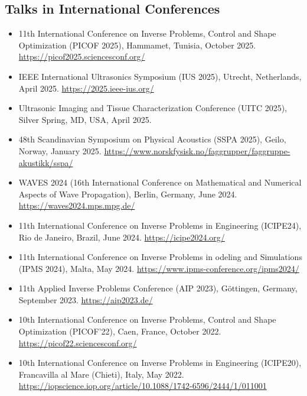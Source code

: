 \documentclass[10pt]{article}
\begin{document}
\subsection{Talks in International Conferences}
\begin{itemize}
\item 11th International Conference on Inverse Problems, Control and Shape Optimization (PICOF 2025), Hammamet, Tunisia, October 2025. \url{https://picof2025.sciencesconf.org/}
\item IEEE International Ultrasonics Symposium (IUS 2025), Utrecht, Netherlands, April 2025. \url{https://2025.ieee-ius.org/}
\item Ultrasonic Imaging and Tissue Characterization Conference (UITC 2025), Silver Spring, MD, USA, April 2025.
\item 48th Scandinavian Symposium on Physical Acoustics (SSPA 2025), Geilo, Norway, January 2025. \url{https://www.norskfysisk.no/faggrupper/faggruppe-akustikk/sspa/}
\item WAVES 2024 (16th International Conference on Mathematical and Numerical Aspects of Wave Propagation), Berlin, Germany, June 2024. \url{https://waves2024.mps.mpg.de/}
\item 11th International Conference on Inverse Problems in Engineering (ICIPE24), Rio de Janeiro, Brazil, June 2024. \url{https://icipe2024.org/}
\item 11th International Conference on Inverse Problems in odeling and Simulations (IPMS 2024), Malta, May 2024. \url{https://www.ipms-conference.org/ipms2024/}
\item 11th Applied Inverse Problems Conference (AIP 2023), Göttingen, Germany, September 2023. \url{https://aip2023.de/}
\item 10th International Conference on Inverse Problems, Control and Shape Optimization (PICOF'22), Caen, France, October 2022. \url{https://picof22.sciencesconf.org/}
\item 10th International Conference on Inverse Problems in Engineering (ICIPE20), Francavilla al Mare (Chieti), Italy, May 2022. \url{https://iopscience.iop.org/article/10.1088/1742-6596/2444/1/011001}
\end{itemize}
\end{document}
